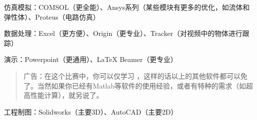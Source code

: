 \documentclass[a4paper,10pt,english]{sphinxmanual}
\begin{document}
仿真模拟：COMSOL（更全能）、Ansys系列（某些模块有更多的优化，如流体和弹性体）、Proteus（电路仿真）

数据处理：Excel（更方便）、Origin（更专业）、Tracker（对视频中的物体进行跟踪）

演示：Powerpoint（更通用）、LaTeX Beamer（更专业）
\begin{quote}

广告：在这个比赛中，你可以仅学习  ，这样的话以上的其他软件都可以免了。当然如果你已经有Matlab等软件的使用经验，或者有特种的需求（如超高性能计算），就另说了。
\end{quote}

工程制图：Solidworks（主要3D）、AutoCAD（主要2D）



\renewcommand{\indexname}{索引}
\printindex
\end{document}
